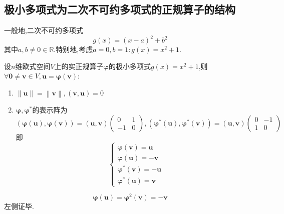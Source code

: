 \subsection{极小多项式为二次不可约多项式的正规算子的结构}
\begin{red}
    \begin{remark}
        一般地,二次不可约多项式\[
        g\left(x\right)=\left(x-a\right)^2+b^2
        \]其中$a,b\neq0\in\mathbb{R}$.特别地,考虑$a=0,b=1:g\left(x\right)=x^2+1.$
    \end{remark}
\end{red}
\begin{green}
    \begin{lemma}[适合简单多项式的正规算子]\label{lem:适合简单多项式的正规算子}
        设$n$维欧式空间$V$上的实正规算子$\bm{\varphi}$的极小多项式$g\left(x\right)=x^2+1$,则$\forall\bm{0}\neq\bm{v}\in V,\bm{u}=\bm{\varphi}\left(\bm{v}\right):$\begin{enumerate}[label={\textup{(\arabic*)}}]
            \item $\left\lVert\bm{u}\right\rVert=\left\lVert\bm{v}\right\rVert,\left(
                \bm{v},\bm{u}
            \right)=0$
            \item $\bm{\varphi},\bm{\varphi}^*$的表示阵为\[
            \left(
                \bm{\varphi}\left(\bm{u}\right),\bm{\varphi}\left(\bm{v}\right)
            \right)=\left(\bm{u},\bm{v}\right)\begin{pmatrix}
                0&1\\
                -1&0
            \end{pmatrix},\left(
                \bm{\varphi}^*\left(\bm{u}\right),\bm{\varphi}^*\left(\bm{v}\right)
            \right)=\left(\bm{u},\bm{v}\right)\begin{pmatrix}
                0&-1\\
                1&0
            \end{pmatrix}
            \]即\[
            \begin{cases*}
                \bm{\varphi}\left(\bm{v}\right)=\bm{u}\\
                \bm{\varphi}\left(\bm{u}\right)=-\bm{v}\\
                \bm{\varphi}^*\left(\bm{v}\right)=-\bm{u}\\
                \bm{\varphi}^*\left(\bm{u}\right)=\bm{v}
            \end{cases*}
            \]
        \end{enumerate}
    \end{lemma}
    \begin{Proof}
        \[\bm{\varphi}
        \left(
            \bm{u}
        \right)=\bm{\varphi}^2\left(
            \bm{v}
            \right)=-\bm{v}
        \]左侧证毕.


\end{Proof}
\end{green}
